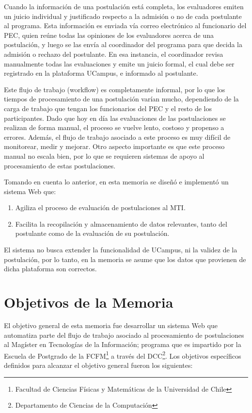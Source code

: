 \begin{intro}
	Cuando la información de una postulación está completa, los evaluadores emiten
	un juicio individual y justificado respecto a la admisión o no de cada
	postulante al programa. Esta información es enviada vía correo electrónico al
	funcionario del PEC, quien reúne todas las opiniones de los evaluadores acerca
	de una postulación, y luego se las envía al coordinador del programa para que
	decida la admisión o rechazo del postulante. En esa instancia, el coordinador
	revisa manualmente todas las evaluaciones y emite un juicio formal, el cual debe
	ser registrado en la plataforma UCampus, e informado al postulante.

	Este flujo de trabajo (workflow) es completamente informal, por lo que los
	tiempos de procesamiento de una postulación varían mucho, dependiendo de la
	carga de trabajo que tengan los funcionarios del PEC y el resto de los
	participantes. Dado que hoy en día las evaluaciones de las postulaciones se
	realizan de forma manual, el proceso se vuelve lento, costoso y propenso a
	errores. Además, el flujo de trabajo asociado a este proceso es muy difícil de
	monitorear, medir y mejorar. Otro aspecto importante es que este proceso manual
	no escala bien, por lo que se requieren sistemas de apoyo al procesamiento de
	estas postulaciones.

	Tomando en cuenta lo anterior, en esta memoria se diseñó e implementó un sistema Web que:

	\begin{enumerate}
		\item Agiliza el proceso de evaluación de postulaciones al MTI.
		\item Facilita la recopilación y almacenamiento de datos relevantes,
		tanto del postulante como de la evaluación de su postulación.
	\end{enumerate}

	El sistema no busca extender la funcionalidad de UCampus, ni la validez de
	la postulación, por lo tanto, en la memoria se asume que los datos que
	provienen de dicha plataforma son correctos. 

	\section{Objetivos de la Memoria}

	El objetivo general de esta memoria fue desarrollar un sistema Web que
	automatiza parte del flujo de trabajo asociado al procesamiento de
	postulaciones al Magíster en Tecnologías de la Información; programa que es
	impartido por la Escuela de Postgrado de la FCFM\footnote{Facultad de
	Ciencias Físicas y Matemáticas de la Universidad de Chile} a través del
	DCC\footnote{Departamento de Ciencias de la Computación}. Los objetivos
	específicos definidos para alcanzar el objetivo general fueron los
	siguientes:


\end{intro}
